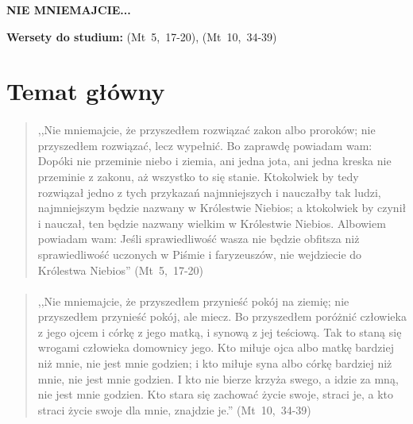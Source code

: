 \documentclass[10pt,a4paper,oneside]{article}
\begin{document}
\centerline{\textbf{\MakeUppercase{Nie mniemajcie...}}}
\begin{center}
\textbf{Wersety do studium:} \mbox{(Mt 5, 17-20)}, \mbox{(Mt 10, 34-39)}
\end{center}
\section{Temat główny}
\paragraph{}
\begin{quote}
,,Nie mniemajcie, że przyszedłem rozwiązać zakon albo proroków; nie przyszedłem rozwiązać, lecz wypełnić. Bo zaprawdę powiadam wam: Dopóki nie przeminie niebo i ziemia, ani jedna jota, ani jedna kreska nie przeminie z zakonu, aż wszystko to się stanie. Ktokolwiek by tedy rozwiązał jedno z tych przykazań najmniejszych i nauczałby tak ludzi, najmniejszym będzie nazwany w Królestwie Niebios; a ktokolwiek by czynił i nauczał, ten będzie nazwany wielkim w Królestwie Niebios. Albowiem powiadam wam: Jeśli sprawiedliwość wasza nie będzie obfitsza niż sprawiedliwość uczonych w Piśmie i faryzeuszów, nie wejdziecie do Królestwa Niebios'' \mbox{(Mt 5, 17-20)}
\end{quote}
\paragraph{}
\begin{quote}
,,Nie mniemajcie, że przyszedłem przynieść pokój na ziemię; nie przyszedłem przynieść pokój, ale miecz. Bo przyszedłem poróżnić człowieka z jego ojcem i córkę z jego matką, i synową z jej teściową. Tak to staną się wrogami człowieka domownicy jego. Kto miłuje ojca albo matkę bardziej niż mnie, nie jest mnie godzien; i kto miłuje syna albo córkę bardziej niż mnie, nie jest mnie godzien. I kto nie bierze krzyża swego, a idzie za mną, nie jest mnie godzien. Kto stara się zachować życie swoje, straci je, a kto straci życie swoje dla mnie, znajdzie je.'' \mbox{(Mt 10, 34-39)}
\end{quote}
\end{document}
